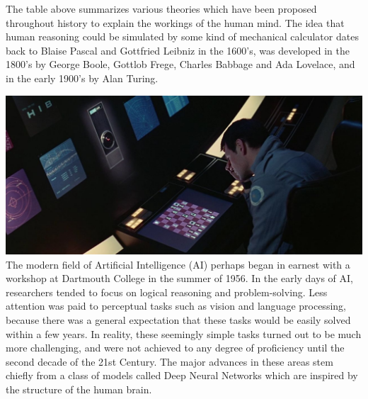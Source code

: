 \documentclass[11pt]{article}
\begin{document}
The table above summarizes various theories which have been proposed throughout history to explain the workings of the human mind.
The idea that human reasoning could be simulated by some kind of mechanical calculator dates back to Blaise Pascal and Gottfried Leibniz in the 1600's, was developed in the 1800's by George Boole, Gottlob Frege, Charles Babbage and Ada Lovelace, and in the early 1900's by Alan Turing.

\includegraphics{img_1}
The modern field of Artificial Intelligence (AI) perhaps began in earnest with a workshop at Dartmouth College in the summer of 1956.
In the early days of AI, researchers tended to focus on logical reasoning and problem-solving.
Less attention was paid to perceptual tasks such as vision and language processing, because there was a general expectation that these tasks would be easily solved within a few years.
In reality, these seemingly simple tasks turned out to be much more challenging, and were not achieved to any degree of proficiency until the second decade of the 21st Century.
The major advances in these areas stem chiefly from a class of models called Deep Neural Networks which are inspired by the structure of the human brain.
\end{document}
